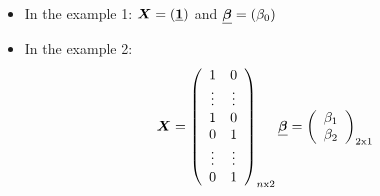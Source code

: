 \begin{frame}
  \begin{itemize}
    \vspace{0.5cm}
    \item In the example 1: $ \boldsymbol{X} = (\boldsymbol{\underline{1}}) $ and $ \boldsymbol{\underline{\beta}} = (\beta_0) $
    \vspace{0.5cm}
    \item In the example 2: 
      $$ 
        \boldsymbol{X} = 
        \left(
          \begin{array}{cc} 
            1 & 0 \\
            \vdots & \vdots \\
            1 & 0 \\
            0 & 1 \\
            \vdots & \vdots \\
            0 & 1 \\  
          \end{array}
        \right)_{n\text{x}2}
        \boldsymbol{\underline{\beta}} =
        \left(
          \begin{array}{c} 
            \beta_1 \\
            \beta_2 \\
          \end{array}
        \right)_{2\text{x}1}
      $$
  \end{itemize}
\end{frame}

